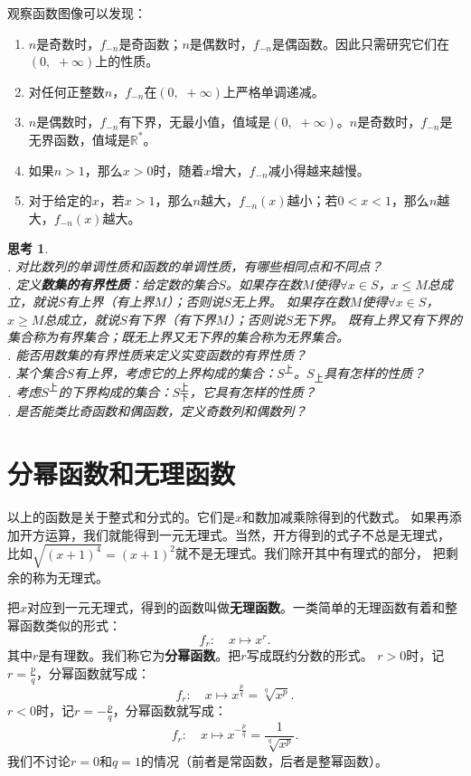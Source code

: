 \documentclass[12pt,UTF8]{ctexbook}
\newtheorem{sk}{思考}[section]
\begin{document}
观察函数图像可以发现：
\begin{enumerate}
    \item $n$是奇数时，$f_{-n}$是奇函数；$n$是偶数时，$f_{-n}$是偶函数。因此只需研究它们在$(0, \,\, +\infty)$上的性质。
    \item 对任何正整数$n$，$f_{-n}$在$(0, \,\, +\infty)$上严格单调递减。
    \item $n$是偶数时，$f_{-n}$有下界，无最小值，值域是$(0, \,\, +\infty)$。$n$是奇数时，$f_{-n}$是无界函数，值域是$\mathbb{R}^*$。
    \item 如果$n>1$，那么$x>0$时，随着$x$增大，$f_{-n}$减小得越来越慢。
    \item 对于给定的$x$，若$x>1$，那么$n$越大，$f_{-n}(x)$越小；若$0 < x<1$，那么$n$越大，$f_{-n}(x)$越大。
\end{enumerate}

\begin{sk}
    \mbox{} \\
    . 对比数列的单调性质和函数的单调性质，有哪些相同点和不同点？\\
    . 定义\textbf{数集的有界性质}：给定数的集合$S$。如果存在数$M$使得$\forall x \in S$，$x \leqslant M$总成立，就说$S$有上界（有上界$M$）；否则说$S$无上界。
    如果存在数$M$使得$\forall x \in S$，$x \geqslant M$总成立，就说$S$有下界（有下界$M$）；否则说$S$无下界。
    既有上界又有下界的集合称为有界集合；既无上界又无下界的集合称为无界集合。\\
    . 能否用数集的有界性质来定义实变函数的有界性质？\\
    . 某个集合$S$有上界，考虑它的上界构成的集合：$S^{\text{上}}$。$S_{\text{上}}$具有怎样的性质？\\
    . 考虑$S^{\text{上}}$的下界构成的集合：$S^{\text{上}}_{\text{下}}$，它具有怎样的性质？\\
    . 是否能类比奇函数和偶函数，定义奇数列和偶数列？
\end{sk}

\section{分幂函数和无理函数}
以上的函数是关于整式和分式的。它们是$x$和数加减乘除得到的代数式。
如果再添加开方运算，我们就能得到一元无理式。当然，开方得到的式子不总是无理式，
比如$\sqrt{(x+1)^4} = (x+1)^2$就不是无理式。我们除开其中有理式的部分，
把剩余的称为无理式。

把$x$对应到一元无理式，得到的函数叫做\textbf{无理函数}。一类简单的无理函数有着和整幂函数类似的形式：
$$ f_r : \quad x \mapsto x^r. $$
其中$r$是有理数。我们称它为\textbf{分幂函数}。把$r$写成既约分数的形式。
$r > 0$时，记$r = \frac{p}{q}$，分幂函数就写成：
$$ f_r : \quad x \mapsto x^\frac{p}{q} = \sqrt[q]{x^p}. $$
$r < 0$时，记$r = -\frac{p}{q}$，分幂函数就写成：
$$ f_r : \quad x \mapsto x^{-\frac{p}{q}} = \frac{1}{\sqrt[q]{x^p}} . $$
我们不讨论$r=0$和$q=1$的情况（前者是常函数，后者是整幂函数）。
\end{document}
